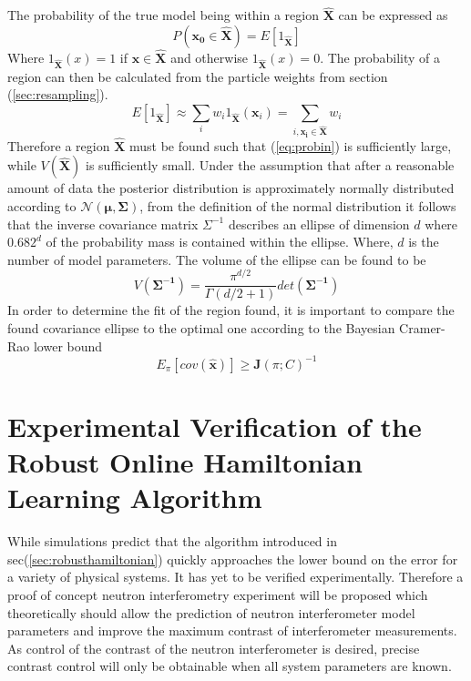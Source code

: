 The probability of the true model being within a region $\mathbf{\hat{X}}$ can be expressed as 
\begin{equation}
P(\mathbf{x_0}\in \mathbf{\hat{X}}) = E[1_{\mathbf{\hat{X}}}]
\end{equation}
Where $1_{\mathbf{\hat{X}}}(x) = 1$ if $\mathbf{x}\in \mathbf{\hat{X}}$ and otherwise $1_{\mathbf{\hat{X}}}(x) = 0$. 
The probability of a region can then be calculated from the particle weights from section (\ref{sec:resampling}). 
\begin{equation}
E[1_{\mathbf{\hat{X}}}] \approx \sum \limits_i w_i 1_{\mathbf{\hat{X}}}(\mathbf{x}_i) = \sum \limits_{i,\mathbf{x_i}\in\mathbf{\hat{X}}} w_i
\label{eq:probin}
\end{equation}
Therefore a region $\mathbf{\hat{X}}$ must be found such that (\ref{eq:probin}) is sufficiently large, while $V(\mathbf{\hat{X}})$ is sufficiently small. Under the assumption that after a reasonable amount of data the posterior distribution is approximately normally distributed according to $\mathcal{N}(\mathbf{\mu},\mathbf{\Sigma})$, from the definition of the normal distribution it follows that the inverse covariance matrix $\Sigma^{-1}$ describes an ellipse of dimension $d$ where $0.682^d$ of the probability mass is contained within the ellipse. Where, $d$ is the number of model parameters. 
The volume of the ellipse can be found to be 
\begin{equation}
V(\mathbf{\Sigma^{-1}}) = \frac{\pi^{d/2}}{\Gamma(d/2+1)}det(\mathbf{\Sigma^{-1}}) 
\end{equation}
In order to determine the fit of the region found, it is important to compare the found covariance ellipse to the optimal one according to the Bayesian Cramer-Rao lower bound 
\begin{equation*}
E_\pi [cov(\mathbf{\hat{x}})] \geq \mathbf{J}(\pi;C)^{-1}
\end{equation*}
\section{Experimental Verification of the Robust Online Hamiltonian Learning Algorithm}
While simulations predict that the algorithm introduced in sec(\ref{sec:robusthamiltonian}) quickly approaches the lower bound on the error for a variety of physical systems.\cite{hamiltonian_learning} It has yet to be verified experimentally. Therefore a proof of concept neutron interferometry experiment will be proposed which theoretically should allow the prediction of neutron interferometer model parameters and improve the maximum contrast of interferometer measurements. As control of the contrast of the neutron interferometer is desired, precise contrast control will only be obtainable when all system parameters are known. 
